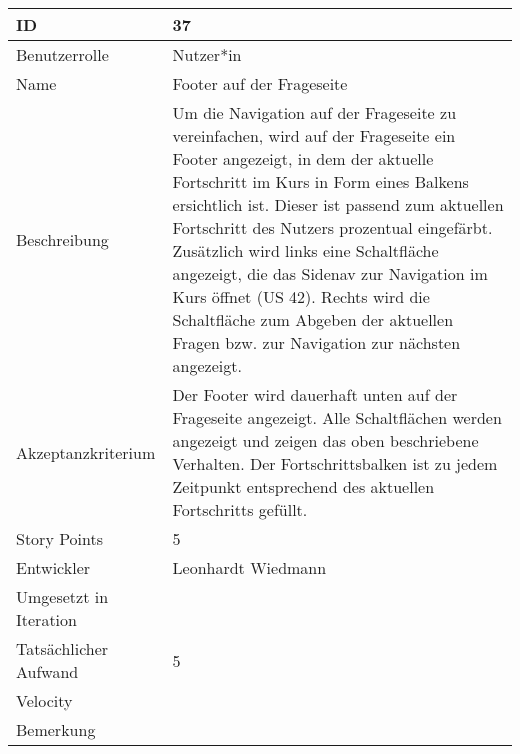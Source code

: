\begin{tabularx}{\textwidth}{|p{}|X|}
	\hline
	ID & 37\\
	\hline
	Benutzerrolle & Nutzer*in\\
	\hline
	Name & Footer auf der Frageseite\\
	\hline
	Beschreibung & Um die Navigation auf der Frageseite zu vereinfachen, wird auf der Frageseite ein Footer angezeigt, in dem der aktuelle Fortschritt im Kurs in Form eines Balkens ersichtlich ist. Dieser ist passend zum aktuellen Fortschritt des Nutzers prozentual eingefärbt. Zusätzlich wird links eine Schaltfläche angezeigt, die das Sidenav zur Navigation im Kurs öffnet (US 42). Rechts wird die Schaltfläche zum Abgeben der aktuellen Fragen bzw. zur Navigation zur nächsten angezeigt.\\
	\hline
	Akzeptanzkriterium & Der Footer wird dauerhaft unten auf der Frageseite angezeigt. Alle Schaltflächen werden angezeigt und zeigen das oben beschriebene Verhalten. Der Fortschrittsbalken ist zu jedem Zeitpunkt entsprechend des aktuellen Fortschritts gefüllt.\\
	\hline
	Story Points & 5\\
	\hline
	Entwickler & Leonhardt Wiedmann\\
	\hline
	Umgesetzt in Iteration & \\
	\hline
	Tatsächlicher Aufwand & 5 \\
	\hline
	Velocity & \\
	\hline
	Bemerkung & \\
	\hline
\end{tabularx}
\vspace{20pt}
